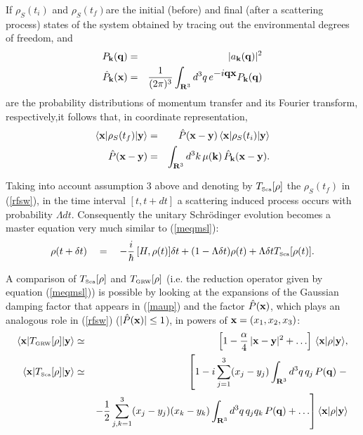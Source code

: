 \documentclass[10pt,a4paper]{article}
\begin{document}
If $\rho_{S}(t_{i})$ and $\rho_{S}(t_{f})$are the initial (before)
and final (after a scattering process) states of the system
obtained by tracing out the environmental  degrees of freedom, and
\begin{eqnarray} \label{pgiu}
P_{\bf k}({\bf q}) & = & |a_{\bf k}({\bf q})|^{2} \\
\hat{P}_{\bf k}({\bf x}) & = & \frac{1}{(2\pi)^{3}} \int_{{\bf
R}^{3}} d^{3}q\, e^{\displaystyle -i {\bf q x}} P_{\bf k}({\bf q})
\end{eqnarray}
are the probability distributions of momentum transfer and its Fourier
transform,
respectively,it follows that, in coordinate representation,
\begin{eqnarray} \label{rfsw}
\langle {\bf x}| \rho_{S}(t_{f}) | {\bf y} \rangle & = &
\hat{P}({\bf x} - {\bf y})\,
\langle {\bf x}| \rho_{S}(t_{i}) | {\bf y} \rangle \\
\hat{P}({\bf x} - {\bf y}) & = & \int_{{\bf R}^{3}} d^{3}k\,
\mu({\bf k})\, \hat{P}_{\bf k}({\bf x} - {\bf y}).
\end{eqnarray}

Taking into account  assumption 3 above and denoting by
$T_{\makebox{\tiny Sca}}[\rho]$ the $\rho_{S}(t_{f})$ in
(\ref{rfsw}), in the time interval $[t, t + dt]$ a scattering
induced process occurs with probability $\Lambda dt$. Consequently
the unitary Schr\"odinger evolution becomes a master equation
very much similar to (\ref{meqmsl}):
\begin{equation} \label{ftjn}
\rho(t + \delta t) \quad = \quad -\frac{i}{\hbar}\, [H, \rho(t)]
\delta t + (1 - \Lambda \delta t) \rho(t) + \Lambda \delta t
T_{\makebox{\tiny Sca}}[\rho(t)].
\end{equation}

A comparison of $T_{\makebox{\tiny Sca}}[\rho]$ and
$T_{\makebox{\tiny GRW}}[\rho]$ (i.e. the reduction operator given
by equation (\ref{meqmsl})) is possible by looking at the
expansions of the Gaussian damping factor that appears in
(\ref{maup}) and the factor $\hat{P}({\bf x})$, which plays an
analogous role in (\ref{rfsw}) ($|\hat{P}({\bf x})| \leq 1$), in
powers of ${\bf x} = (x_{1}, x_{2}, x_{3})$:
\begin{eqnarray}
\langle {\bf x}|T_{\makebox{\tiny GRW}}[\rho]|{\bf y} \rangle &
\simeq & \left[1 - \frac{\alpha}{4}\, |{\bf x} - {\bf y}|^{2} +
\ldots
\right]\, \langle {\bf x}|\rho|{\bf y} \rangle, \\
\langle {\bf x}|T_{\makebox{\tiny Sca}}[\rho]|{\bf y} \rangle &
\simeq & \left[1 - i\sum_{j=1}^{3}(x_{j} - y_{j}) \int_{{\bf
R}^{3}}
d^{3}q\, q_{j}\, P({\bf q}) \; - \right. \label{mmqe} \\
& & \left. -\frac{1}{2}\sum_{j,k=1}^{3}(x_{j} - y_{j})(x_{k} -
y_{k}) \int_{{\bf R}^{3}} d^{3}q\, q_{j}q_{k}\, P({\bf q}) +
\ldots \right] \langle {\bf x}|\rho|{\bf y} \rangle \nonumber
\end{eqnarray}
\end{document}
